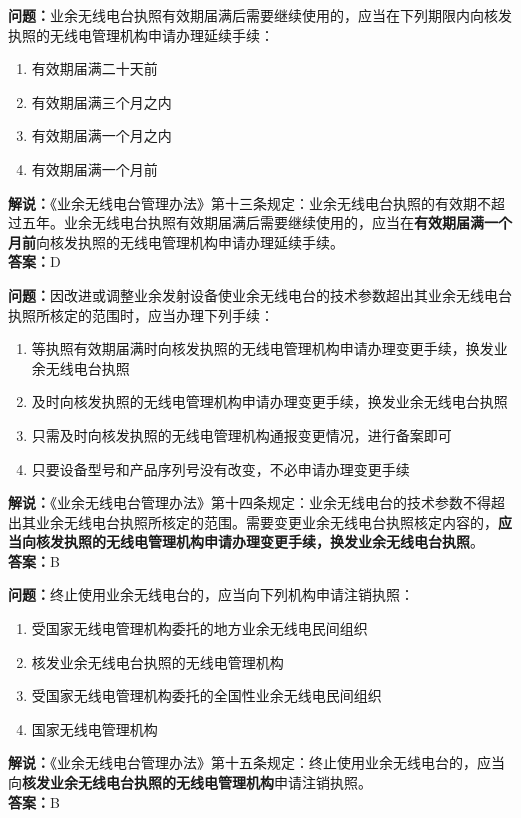 \bigskip


\noindent\textbf{问题：}业余无线电台执照有效期届满后需要继续使用的，应当在下列期限内向核发执照的无线电管理机构申请办理延续手续：
\begin{enumerate}[label=\Alph*), leftmargin=3em]
	\item 有效期届满二十天前
	\item 有效期届满三个月之内
	\item 有效期届满一个月之内
	\item 有效期届满一个月前
\end{enumerate}
\noindent\textbf{解说：}《业余无线电台管理办法》第十三条规定：业余无线电台执照的有效期不超过五年。业余无线电台执照有效期届满后需要继续使用的，应当在\textbf{有效期届满一个月前}向核发执照的无线电管理机构申请办理延续手续。\\\noindent\textbf{答案：}D



\bigskip


\noindent\textbf{问题：}因改进或调整业余发射设备使业余无线电台的技术参数超出其业余无线电台执照所核定的范围时，应当办理下列手续：
\begin{enumerate}[label=\Alph*), leftmargin=3em]
	\item 等执照有效期届满时向核发执照的无线电管理机构申请办理变更手续，换发业余无线电台执照
	\item 及时向核发执照的无线电管理机构申请办理变更手续，换发业余无线电台执照
	\item 只需及时向核发执照的无线电管理机构通报变更情况，进行备案即可
	\item 只要设备型号和产品序列号没有改变，不必申请办理变更手续
\end{enumerate}
\noindent\textbf{解说：}《业余无线电台管理办法》第十四条规定：业余无线电台的技术参数不得超出其业余无线电台执照所核定的范围。需要变更业余无线电台执照核定内容的，\textbf{应当向核发执照的无线电管理机构申请办理变更手续，换发业余无线电台执照}。\\\noindent\textbf{答案：}B



\bigskip


\noindent\textbf{问题：}终止使用业余无线电台的，应当向下列机构申请注销执照：
\begin{enumerate}[label=\Alph*), leftmargin=3em]
	\item 受国家无线电管理机构委托的地方业余无线电民间组织
	\item 核发业余无线电台执照的无线电管理机构
	\item 受国家无线电管理机构委托的全国性业余无线电民间组织
	\item 国家无线电管理机构
\end{enumerate}
\noindent\textbf{解说：}《业余无线电台管理办法》第十五条规定：终止使用业余无线电台的，应当向\textbf{核发业余无线电台执照的无线电管理机构}申请注销执照。\\\noindent\textbf{答案：}B



